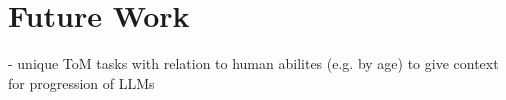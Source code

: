 \section{Future Work}
- unique ToM tasks with relation to human abilites (e.g. by age) to give context for progression of LLMs